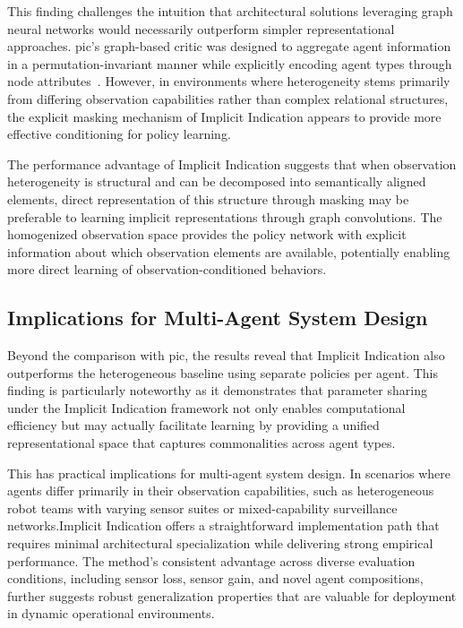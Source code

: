 This finding challenges the intuition that architectural solutions leveraging 
graph neural networks would necessarily outperform simpler representational approaches. 
\gls{pic}'s graph-based critic was designed to aggregate agent information in a 
permutation-invariant manner while explicitly encoding agent types through node 
attributes~\cite{liu2020b}. However, in environments where heterogeneity stems 
primarily from differing observation capabilities rather than complex relational 
structures, the explicit masking mechanism of Implicit Indication appears to provide 
more effective conditioning for policy learning.

The performance advantage of Implicit Indication suggests that when observation 
heterogeneity is structural and can be decomposed into semantically aligned elements, 
direct representation of this structure through masking may be preferable to 
learning implicit representations through graph convolutions. 
The homogenized observation space provides the policy network with explicit information 
about which observation elements are available, potentially enabling more 
direct learning of observation-conditioned behaviors.

\subsection{Implications for Multi-Agent System Design}

Beyond the comparison with \gls{pic}, the results reveal that Implicit Indication 
also outperforms the heterogeneous baseline using separate policies per agent. 
This finding is particularly noteworthy as it demonstrates that parameter 
sharing under the Implicit Indication framework not only enables computational 
efficiency but may actually facilitate learning by providing a unified 
representational space that captures commonalities across agent types.

This has practical implications for multi-agent system design. 
In scenarios where agents differ primarily in their observation capabilities, 
such as heterogeneous robot teams with varying sensor suites or 
mixed-capability surveillance networks.Implicit Indication offers a 
straightforward implementation path that requires minimal 
architectural specialization while delivering strong empirical performance. 
The method's consistent advantage across diverse evaluation conditions, 
including sensor loss, sensor gain, and novel agent compositions, 
further suggests robust generalization properties that are valuable 
for deployment in dynamic operational environments.

